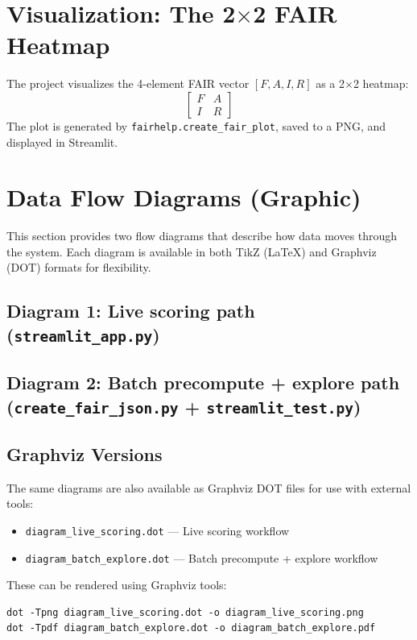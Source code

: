 \documentclass[11pt]{article}
\begin{document}
\section{Visualization: The 2$\times$2 FAIR Heatmap}
The project visualizes the 4-element FAIR vector \([F, A, I, R]\) as a 2$\times$2 heatmap:
\[
\begin{bmatrix}
F & A \\
I & R
\end{bmatrix}
\]
The plot is generated by \texttt{fairhelp.create\_fair\_plot}, saved to a PNG, and displayed in Streamlit.

\section{Data Flow Diagrams (Graphic)}
This section provides two flow diagrams that describe how data moves through the system. Each diagram is available in both TikZ (LaTeX) and Graphviz (DOT) formats for flexibility.

\subsection{Diagram 1: Live scoring path (\texttt{streamlit\_app.py})}


\clearpage
\subsection{Diagram 2: Batch precompute + explore path (\texttt{create\_fair\_json.py} + \texttt{streamlit\_test.py})}


\subsection{Graphviz Versions}
The same diagrams are also available as Graphviz DOT files for use with external tools:
\begin{itemize}[leftmargin=2em]
  \item \texttt{diagram\_live\_scoring.dot} --- Live scoring workflow
  \item \texttt{diagram\_batch\_explore.dot} --- Batch precompute + explore workflow
\end{itemize}
These can be rendered using Graphviz tools:
\begin{lstlisting}[style=base]
dot -Tpng diagram_live_scoring.dot -o diagram_live_scoring.png
dot -Tpdf diagram_batch_explore.dot -o diagram_batch_explore.pdf
\end{lstlisting}
\end{document}
